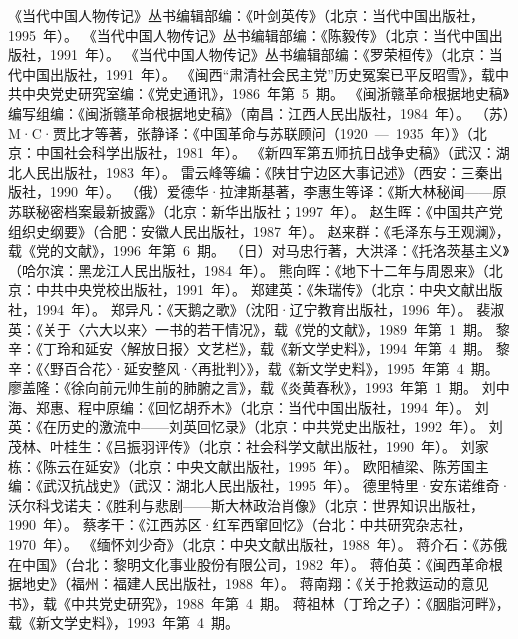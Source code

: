 \begin{thebibliography}{999}
\bibitem{}《当代中国人物传记》丛书编辑部编：《叶剑英传》（北京：当代中国出版社，1995~年）。
\bibitem{}《当代中国人物传记》丛书编辑部编：《陈毅传》（北京：当代中国出版社，1991~年）。
\bibitem{}《当代中国人物传记》丛书编辑部编：《罗荣桓传》（北京：当代中国出版社，1991~年）。
\bibitem{}《闽西“肃清社会民主党”历史冤案已平反昭雪》，载中共中央党史研究室编：《党史通讯》，1986~年第~5~期。
\bibitem{}《闽浙赣革命根据地史稿》编写组编：《闽浙赣革命根据地史稿》（南昌：江西人民出版社，1984~年）。
\bibitem{}（苏）M·C·贾比才等著，张静译：《中国革命与苏联顾问（1920~—~1935~年）》（北京：中国社会科学出版社，1981~年）。
\bibitem{}《新四军第五师抗日战争史稿》（武汉：湖北人民出版社，1983~年）。
\bibitem{}雷云峰等编：《陕甘宁边区大事记述》（西安：三秦出版社，1990~年）。
\bibitem{}（俄）爱德华·拉津斯基著，李惠生等译：《斯大林秘闻——原苏联秘密档案最新披露》（北京：新华出版社；1997~年）。
\bibitem{}赵生晖：《中国共产党组织史纲要》（合肥：安徽人民出版社，1987~年）。
\bibitem{}赵来群：《毛泽东与王观澜》，载《党的文献》，1996~年第~6~期。
\bibitem{}（日）对马忠行著，大洪泽：《托洛茨基主义》（哈尔滨：黑龙江人民出版社，1984~年）。
\bibitem{}熊向晖：《地下十二年与周恩来》（北京：中共中央党校出版社，1991~年）。
\bibitem{}郑建英：《朱瑞传》（北京：中央文献出版社，1994~年）。
\bibitem{}郑异凡：《天鹅之歌》（沈阳·辽宁教育出版社，1996~年）。
\bibitem{}裴淑英：《关于〈六大以来〉一书的若干情况》，载《党的文献》，1989~年第~1~期。
\bibitem{}黎辛：《丁玲和延安〈解放日报〉文艺栏》，载《新文学史料》，1994~年第~4~期。
\bibitem{}黎辛：《〈野百合花〉·延安整风·〈再批判〉》，载《新文学史料》，1995~年第~4~期。
\bibitem{}廖盖隆：《徐向前元帅生前的肺腑之言》，载《炎黄春秋》，1993~年第~1~期。
\bibitem{}刘中海、郑惠、程中原编：《回忆胡乔木》（北京：当代中国出版社，1994~年）。
\bibitem{}刘英：《在历史的激流中——刘英回忆录》（北京：中共党史出版社，1992~年）。
\bibitem{}刘茂林、叶桂生：《吕振羽评传》（北京：社会科学文献出版社，1990~年）。
\bibitem{}刘家栋：《陈云在延安》（北京：中央文献出版社，1995~年）。
\bibitem{}欧阳植梁、陈芳国主编：《武汉抗战史》（武汉：湖北人民出版社，1995~年）。
\bibitem{}德里特里·安东诺维奇·沃尔科戈诺夫：《胜利与悲剧——斯大林政治肖像》（北京：世界知识出版社，1990~年）。
\bibitem{}蔡孝干：《江西苏区·红军西窜回忆》（台北：中共研究杂志社，1970~年）。
\bibitem{}《缅怀刘少奇》（北京：中央文献出版社，1988~年）。
\bibitem{}蒋介石：《苏俄在中国》（台北：黎明文化事业股份有限公司，1982~年）。
\bibitem{}蒋伯英：《闽西革命根据地史》（福州：福建人民出版社，1988~年）。
\bibitem{}蒋南翔：《关于抢救运动的意见书》，载《中共党史研究》，1988~年第~4~期。
\bibitem{}蒋祖林（丁玲之子）：《胭脂河畔》，载《新文学史料》，1993~年第~4~期。

\end{thebibliography}
